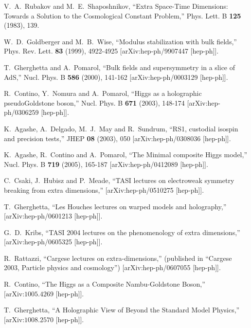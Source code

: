 \documentclass[12pt]{article}
\numberwithin{equation}{section}
\begin{document}
\begin{thebibliography}{999}
V.~A.~Rubakov and M.~E.~Shaposhnikov,
``Extra Space-Time Dimensions: Towards a Solution to the Cosmological Constant Problem,''
Phys. Lett. B \textbf{125} (1983), 139.

W.~D.~Goldberger and M.~B.~Wise,
``Modulus stabilization with bulk fields,''
Phys. Rev. Lett. \textbf{83} (1999), 4922-4925 [arXiv:hep-ph/9907447 [hep-ph]].

T.~Gherghetta and A.~Pomarol,
``Bulk fields and supersymmetry in a slice of AdS,''
Nucl. Phys. B \textbf{586} (2000), 141-162 [arXiv:hep-ph/0003129 [hep-ph]].

R.~Contino, Y.~Nomura and A.~Pomarol,
``Higgs as a holographic pseudoGoldstone boson,''
Nucl. Phys. B \textbf{671} (2003), 148-174 [arXiv:hep-ph/0306259 [hep-ph]].

K.~Agashe, A.~Delgado, M.~J.~May and R.~Sundrum,
``RS1, custodial isospin and precision tests,''
JHEP \textbf{08} (2003), 050 [arXiv:hep-ph/0308036 [hep-ph]].

K.~Agashe, R.~Contino and A.~Pomarol,
``The Minimal composite Higgs model,''
Nucl. Phys. B \textbf{719} (2005), 165-187 [arXiv:hep-ph/0412089 [hep-ph]].

C.~Csaki, J.~Hubisz and P.~Meade,
``TASI lectures on electroweak symmetry breaking from extra dimensions,'' [arXiv:hep-ph/0510275 [hep-ph]].

T.~Gherghetta,
``Les Houches lectures on warped models and holography,''
[arXiv:hep-ph/0601213 [hep-ph]].

G.~D.~Kribs,
``TASI 2004 lectures on the phenomenology of extra dimensions,'' [arXiv:hep-ph/0605325 [hep-ph]].

R.~Rattazzi,
``Cargese lectures on extra-dimensions,'' (published in ``Cargese 2003, Particle physics and cosmology'') [arXiv:hep-ph/0607055 [hep-ph]].

R.~Contino,
``The Higgs as a Composite Nambu-Goldstone Boson,''\\
$\mbox{[arXiv:1005.4269 [hep-ph]]}$.

T.~Gherghetta,
``A Holographic View of Beyond the Standard Model Physics,''\\
$\mbox{[arXiv:1008.2570 [hep-ph]]}$.


\end{thebibliography}
\end{document}
